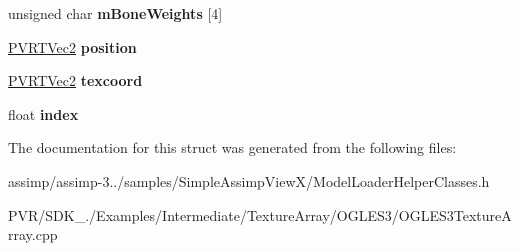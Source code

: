 \begin{DoxyCompactItemize}
\item 
\hypertarget{struct_vertex_a2131babcee6861f0e9990e51bd4dfe5d}{unsigned char {\bfseries m\+Bone\+Weights} \mbox{[}4\mbox{]}}\label{struct_vertex_a2131babcee6861f0e9990e51bd4dfe5d}

\item 
\hypertarget{struct_vertex_a95bf380a68ab4cf43741bbb175304730}{\hyperlink{struct_p_v_r_t_vec2}{P\+V\+R\+T\+Vec2} {\bfseries position}}\label{struct_vertex_a95bf380a68ab4cf43741bbb175304730}

\item 
\hypertarget{struct_vertex_a07c17b4ee98817a05e7286ed67039d46}{\hyperlink{struct_p_v_r_t_vec2}{P\+V\+R\+T\+Vec2} {\bfseries texcoord}}\label{struct_vertex_a07c17b4ee98817a05e7286ed67039d46}

\item 
\hypertarget{struct_vertex_aaef4f3c9e0c88e9c7705fd1a42c43404}{float {\bfseries index}}\label{struct_vertex_aaef4f3c9e0c88e9c7705fd1a42c43404}

\end{DoxyCompactItemize}


The documentation for this struct was generated from the following files\+:\begin{DoxyCompactItemize}
\item 
assimp/assimp-\/3../samples/\+Simple\+Assimp\+View\+X/Model\+Loader\+Helper\+Classes.\+h\item 
P\+V\+R/\+S\+D\+K\+\_./\+Examples/\+Intermediate/\+Texture\+Array/\+O\+G\+L\+E\+S3/O\+G\+L\+E\+S3\+Texture\+Array.\+cpp\end{DoxyCompactItemize}
